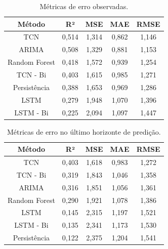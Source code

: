 
\begin{table}[h] %
    \centering
    \begin{tabular}{|c|c|c|c|c|}
    \hline
    \textbf{Método} & \textbf{R²} & \textbf{MSE} & \textbf{MAE} & \textbf{RMSE} \\ \hline
    TCN & 0,514 & 1,314 & 0,862 & 1,146 \\ \hline
    ARIMA & 0,508 & 1,329 & 0,881 & 1,153 \\ \hline
    Random Forest & 0,418 & 1,572 & 0,939 & 1,254 \\ \hline
    TCN - Bi & 0,403 & 1,615 & 0,985 & 1,271 \\ \hline
    Persistência & 0,388 & 1,653 & 0,969 & 1,286 \\ \hline
    LSTM & 0,279 & 1,948 & 1,070 & 1,396 \\ \hline
    LSTM - Bi & 0,225 & 2,094 & 1,097 & 1,447 \\ \hline
    \end{tabular}
    \caption{Métricas de erro observadas.}
    \label{tab:error_all}
\end{table}

\begin{table}[h] %
    \centering
    \begin{tabular}{|c|c|c|c|c|}
    \hline
    \textbf{Método} & \textbf{R²} & \textbf{MSE} & \textbf{MAE} & \textbf{RMSE} \\ \hline
    TCN & 0,403 & 1,618 & 0,983 & 1,272 \\ \hline
    TCN - Bi & 0,319 & 1,843 & 1,046 & 1,358 \\ \hline
    ARIMA & 0,316 & 1,851 & 1,056 & 1,361 \\ \hline
    Random Forest & 0,290 & 1,921 & 1,078 & 1,386 \\ \hline
    LSTM & 0,145 & 2,315 & 1,197 & 1,521 \\ \hline
    LSTM - Bi & 0,135 & 2,341 & 1,173 & 1,530 \\ \hline
    Persistência & 0,122 & 2,375 & 1,204 & 1,541 \\ \hline
    \end{tabular}
    \caption{Métricas de erro no último horizonte de predição.}
    \label{tab:error_h36}
\end{table}
